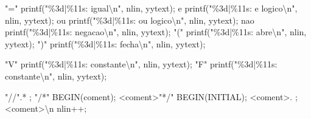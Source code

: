 \documentclass[
  brazilian,
  letterpaper,
]{book}
\newenvironment{Shaded}{\begin{snugshade}}{\end{snugshade}}
\newcommand{\NormalTok}[1]{\textcolor[rgb]{0.00,0.23,0.31}{#1}}
\newcommand{\OperatorTok}[1]{\textcolor[rgb]{0.37,0.37,0.37}{#1}}
\newcommand{\SpecialCharTok}[1]{\textcolor[rgb]{0.37,0.37,0.37}{#1}}
\newcommand{\StringTok}[1]{\textcolor[rgb]{0.13,0.47,0.30}{#1}}
\theoremstyle{plain}
\theoremstyle{definition}
\theoremstyle{remark}
\begin{document}
\begin{Shaded}
\begin{Highlighting}[]
\StringTok{"="}\NormalTok{          printf}\OperatorTok{(}\StringTok{"}\SpecialCharTok{\%3d}\StringTok{|}\SpecialCharTok{\%11s}\StringTok{: igual}\SpecialCharTok{\textbackslash{}n}\StringTok{"}\OperatorTok{,}\NormalTok{ nlin}\OperatorTok{,}\NormalTok{ yytext}\OperatorTok{);}
\NormalTok{e            printf}\OperatorTok{(}\StringTok{"}\SpecialCharTok{\%3d}\StringTok{|}\SpecialCharTok{\%11s}\StringTok{: e logico}\SpecialCharTok{\textbackslash{}n}\StringTok{"}\OperatorTok{,}\NormalTok{ nlin}\OperatorTok{,}\NormalTok{ yytext}\OperatorTok{);}
\NormalTok{ou           printf}\OperatorTok{(}\StringTok{"}\SpecialCharTok{\%3d}\StringTok{|}\SpecialCharTok{\%11s}\StringTok{: ou logico}\SpecialCharTok{\textbackslash{}n}\StringTok{"}\OperatorTok{,}\NormalTok{ nlin}\OperatorTok{,}\NormalTok{ yytext}\OperatorTok{);}
\NormalTok{nao          printf}\OperatorTok{(}\StringTok{"}\SpecialCharTok{\%3d}\StringTok{|}\SpecialCharTok{\%11s}\StringTok{: negacao}\SpecialCharTok{\textbackslash{}n}\StringTok{"}\OperatorTok{,}\NormalTok{ nlin}\OperatorTok{,}\NormalTok{ yytext}\OperatorTok{);}
\StringTok{"("}\NormalTok{          printf}\OperatorTok{(}\StringTok{"}\SpecialCharTok{\%3d}\StringTok{|}\SpecialCharTok{\%11s}\StringTok{: abre}\SpecialCharTok{\textbackslash{}n}\StringTok{"}\OperatorTok{,}\NormalTok{ nlin}\OperatorTok{,}\NormalTok{ yytext}\OperatorTok{);}
\StringTok{")"}\NormalTok{          printf}\OperatorTok{(}\StringTok{"}\SpecialCharTok{\%3d}\StringTok{|}\SpecialCharTok{\%11s}\StringTok{: fecha}\SpecialCharTok{\textbackslash{}n}\StringTok{"}\OperatorTok{,}\NormalTok{ nlin}\OperatorTok{,}\NormalTok{ yytext}\OperatorTok{);}

\StringTok{"V"}\NormalTok{          printf}\OperatorTok{(}\StringTok{"}\SpecialCharTok{\%3d}\StringTok{|}\SpecialCharTok{\%11s}\StringTok{: constante}\SpecialCharTok{\textbackslash{}n}\StringTok{"}\OperatorTok{,}\NormalTok{ nlin}\OperatorTok{,}\NormalTok{ yytext}\OperatorTok{);}
\StringTok{"F"}\NormalTok{          printf}\OperatorTok{(}\StringTok{"}\SpecialCharTok{\%3d}\StringTok{|}\SpecialCharTok{\%11s}\StringTok{: constante}\SpecialCharTok{\textbackslash{}n}\StringTok{"}\OperatorTok{,}\NormalTok{ nlin}\OperatorTok{,}\NormalTok{ yytext}\OperatorTok{);}

\StringTok{"//"}\OperatorTok{.*}          \OperatorTok{;}
\StringTok{"/*"}\NormalTok{            BEGIN}\OperatorTok{(}\NormalTok{coment}\OperatorTok{);}
\OperatorTok{\textless{}}\NormalTok{coment}\OperatorTok{\textgreater{}}\StringTok{"*/"}\NormalTok{    BEGIN}\OperatorTok{(}\NormalTok{INITIAL}\OperatorTok{);}
\OperatorTok{\textless{}}\NormalTok{coment}\OperatorTok{\textgreater{}.}       \OperatorTok{;} 
\OperatorTok{\textless{}}\NormalTok{coment}\OperatorTok{\textgreater{}}\NormalTok{\textbackslash{}n      nlin}\OperatorTok{++;}


\end{Highlighting}
\end{Shaded}
\end{document}
